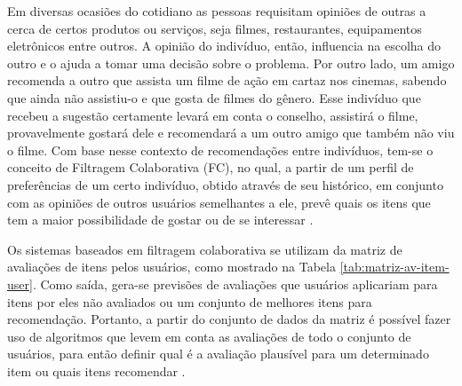    Em diversas ocasiões do cotidiano as pessoas requisitam opiniões de outras a cerca de certos produtos ou serviços, seja filmes, restaurantes, equipamentos eletrônicos entre outros. A opinião do indivíduo, então, influencia na escolha do outro e o ajuda a tomar uma decisão sobre o problema. Por outro lado, um amigo recomenda a outro que assista um filme de ação em cartaz nos cinemas, sabendo que ainda não assistiu-o e que gosta de filmes do gênero. Esse indivíduo que recebeu a sugestão certamente levará em conta o conselho, assistirá o filme, provavelmente gostará dele e recomendará a um outro amigo que também não viu o filme.    
    Com base nesse contexto de recomendações entre indivíduos, tem-se o conceito de Filtragem Colaborativa (FC), no qual, a partir de um perfil de preferências de um certo indivíduo, obtido através de seu histórico, em conjunto com as opiniões de outros usuários semelhantes a ele, prevê quais os itens que tem a maior possibilidade de gostar ou de se interessar \cite{Jannach2010}.



    
    Os sistemas baseados em filtragem colaborativa se utilizam da matriz de avaliações de itens pelos usuários, como mostrado na Tabela \ref{tab:matriz-av-item-user}. Como saída, gera-se previsões de avaliações que usuários aplicariam para itens por eles não avaliados ou um conjunto de melhores itens para recomendação. Portanto, a partir do conjunto de dados da matriz é possível fazer uso de algoritmos que levem em conta as avaliações de todo o conjunto de usuários, para então definir qual é a avaliação plausível para um determinado item ou quais itens recomendar \cite{Bobadilla_2013}.
    
